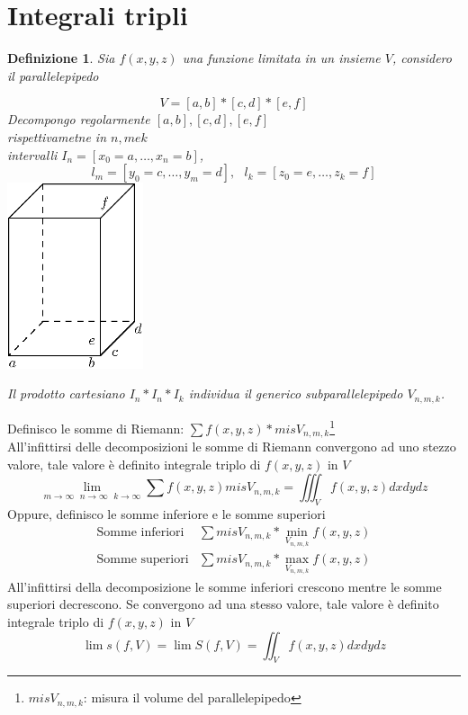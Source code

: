 \documentclass{book}
\newtheorem{defi}{Definizione}
\begin{document}
\section{Integrali tripli}
\begin{defi}
  Sia $f(x,y,z)$ una funzione limitata in un insieme $V$, considero il parallelepipedo
  \begin{multicols}{2}
    \begin{equation*}
      V=[a,b]*[c,d]*[e,f]
    \end{equation*}
    Decompongo regolarmente $[a,b],[c,d],[e,f]$\\
    rispettivametne in $n,m e k$\\
    intervalli $I_n=[x_0=a,\dots,x_n=b]$,
    \begin{equation*}
      l_m=[y_0=c,\dots,y_m=d],\text{ } l_k=[z_0=e,\dots,z_k=f]
    \end{equation*}
    \includegraphics[width=4cm]{img/finiti/rettangolo.eps}
  \end{multicols}
  Il prodotto cartesiano $I_n*I_n*I_k$ individua il generico subparallelepipedo $V_{n,m,k}$.
\end{defi}
\clearpage
Definisco le somme di Riemann: $\sum f(x,y,z)*misV_{n,m,k}$\footnote{$misV_{n,m,k}$: misura il
  volume del parallelepipedo}\\
All'infittirsi delle decomposizioni le somme di Riemann convergono ad uno stezzo valore, tale
valore è definito {\color{red}integrale triplo} di $f(x,y,z)$ in $V$
\begin{equation*}
  \lim_{m\to \infty\text{ } n \to \infty \text{ } k\to \infty}\sum f(x,y,z) misV_{n,m,k}=\iiint_V f(x,y,z)dxdydz
\end{equation*}
Oppure, definisco le somme inferiore e le somme superiori
\begin{equation*}
  \begin{matrix}
    \text{Somme inferiori} &\sum misV_{n,m,k}*\min_{V_{n,m,k}}f(x,y,z)\\
    \text{Somme superiori} &\sum misV_{n,m,k}*\max_{V_{n,m,k}}f(x,y,z)
  \end{matrix}
\end{equation*}
All'infittirsi della decomposizione le somme inferiori crescono mentre le somme superiori
decrescono. Se convergono ad una stesso valore, tale valore è definito {\color{red}integrale triplo}
di $f(x,y,z)$ in $V$
\begin{equation*}
  \lim s(f,V)= \lim S(f,V)= \iint_V f(x,y,z) dxdydz
\end{equation*}
\end{document}

